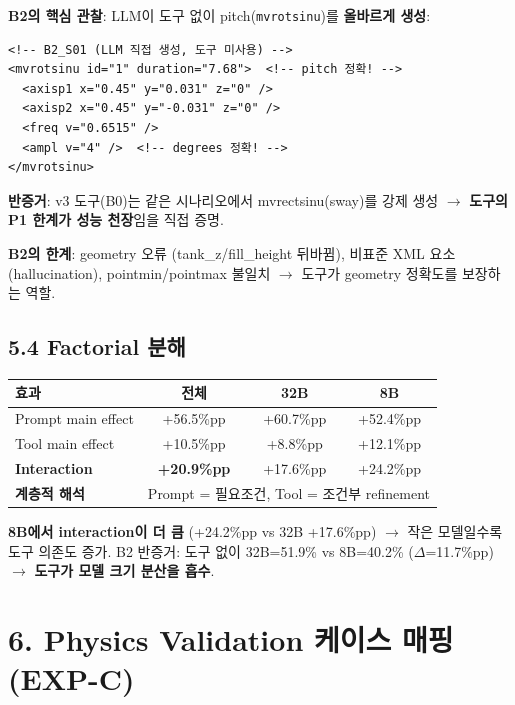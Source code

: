 \documentclass[10pt,a4paper]{article}
\begin{document}
\textbf{B2의 핵심 관찰}: LLM이 도구 없이 pitch(\texttt{mvrotsinu})를 \textbf{올바르게 생성}:

\begin{lstlisting}
<!-- B2_S01 (LLM 직접 생성, 도구 미사용) -->
<mvrotsinu id="1" duration="7.68">  <!-- pitch 정확! -->
  <axisp1 x="0.45" y="0.031" z="0" />
  <axisp2 x="0.45" y="-0.031" z="0" />
  <freq v="0.6515" />
  <ampl v="4" />  <!-- degrees 정확! -->
</mvrotsinu>
\end{lstlisting}

\textbf{반증거}: v3 도구(B0)는 같은 시나리오에서 mvrectsinu(sway)를 강제 생성 $\rightarrow$ \textbf{도구의 P1 한계가 성능 천장}임을 직접 증명.

\textbf{B2의 한계}: geometry 오류 (tank\_z/fill\_height 뒤바뀜), 비표준 XML 요소 (hallucination), pointmin/pointmax 불일치 $\rightarrow$ 도구가 geometry 정확도를 보장하는 역할.

\subsection{5.4 Factorial 분해}

\begin{center}
\begin{tabular}{lccc}
\toprule
\textbf{효과} & \textbf{전체} & \textbf{32B} & \textbf{8B} \\
\midrule
Prompt main effect & +56.5\%pp & +60.7\%pp & +52.4\%pp \\
Tool main effect & +10.5\%pp & +8.8\%pp & +12.1\%pp \\
\textbf{Interaction} & \textbf{+20.9\%pp} & +17.6\%pp & +24.2\%pp \\
\midrule
\textbf{계층적 해석} & \multicolumn{3}{l}{Prompt = 필요조건, Tool = 조건부 refinement} \\
\bottomrule
\end{tabular}
\end{center}

\textbf{8B에서 interaction이 더 큼} (+24.2\%pp vs 32B +17.6\%pp) $\rightarrow$ 작은 모델일수록 도구 의존도 증가. B2 반증거: 도구 없이 32B=51.9\% vs 8B=40.2\% ($\Delta$=11.7\%pp) $\rightarrow$ \textbf{도구가 모델 크기 분산을 흡수}.

\section{6. Physics Validation 케이스 매핑 (EXP-C)}
\end{document}
